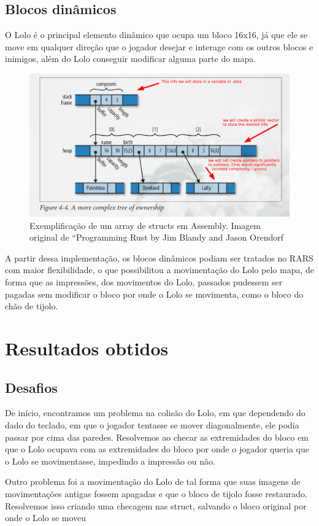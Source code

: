 \documentclass[10pt, conference, compsocconf]{IEEEtran}
\begin{document}
\subsection{Blocos dinâmicos}{
\label{sec:MIPS}
O Lolo é o principal elemento dinâmico que ocupa um
bloco 16x16, já que ele se move em qualquer direção
que o jogador desejar e interage com os outros blocos
e inimigos, além do Lolo conseguir modificar alguma
parte do mapa.

}

\begin{figure}[htb]
  \begin{center}
   \includegraphics[width=1.0\linewidth]{./Figures/image_8.png}
  \end{center}
  \caption{Exemplificação de um array de structs
em Assembly. Imagem original de “Programming
Rust by Jim Blandy and Jason Orendorf}
  \label{fig:01}
\end{figure}

A partir dessa implementação, os blocos dinâmicos podiam ser tratados no RARS
com maior flexibilidade, o que possibilitou a movimentação do Lolo pelo mapa, de
forma que as impressões, dos movimentos do Lolo, passados pudessem ser pagadas
sem modificar o bloco por onde o Lolo se movimenta, como o bloco do chão de
tijolo.


\section{Resultados obtidos}
\label{sec:Resultados}

\subsection{Desafios}{
\label{sec:MIPS}
De início, encontramos um problema na colisão do
Lolo, em que dependendo do dado do teclado, em que
o jogador tentasse se mover diagonalmente, ele podia
passar por cima das paredes. Resolvemos ao checar
as extremidades do bloco em que o Lolo ocupava com
as extremidades do bloco por onde o jogador queria
que o Lolo se movimentasse, impedindo a impressão
ou não.

Outro problema foi a movimentação do Lolo de tal forma que suas imagens de
movimentações antigas fossem apagadas e que o bloco de tijolo fosse restaurado.
Resolvemos isso criando uma checagem nas struct, salvando o bloco original por
onde o Lolo se moveu }
\end{document}
